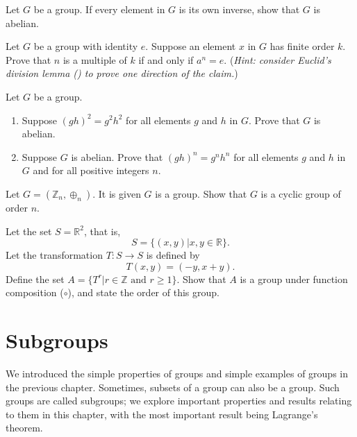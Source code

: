 \begin{problem}
    Let $G$ be a group. If every element in $G$ is its own inverse, show that $G$ is abelian.
\end{problem}

\begin{problem}\label{problem-element-to-power-of-multiple-of-order-is-identity}
    Let $G$ be a group with identity $e$. Suppose an element $x$ in $G$ has finite order $k$. Prove that $n$ is a multiple of $k$ if and only if $a^n = e$.\newline
    (\textit{Hint: consider Euclid's division lemma () to prove one direction of the claim.})
\end{problem}

\begin{problem}
    Let $G$ be a group.
    \begin{enumerate}[label=(\alph*)]
        \item Suppose $(gh)^2 = g^2h^2$ for all elements $g$ and $h$ in $G$. Prove that $G$ is abelian.
        \item Suppose $G$ is abelian. Prove that $(gh)^n = g^nh^n$ for all elements $g$ and $h$ in $G$ and for all positive integers $n$.
    \end{enumerate}
\end{problem}

\begin{problem}
    Let $G = (\mathbb{Z}_n, \oplus_n)$. It is given $G$ is a group. Show that $G$ is a cyclic group of order $n$.
\end{problem}

\newpage

\begin{problem}
    Let the set $S = \mathbb{R}^2$, that is,
    \[
        S = \{(x, y) \vert x, y \in \mathbb{R}\}.
    \]
    Let the transformation $T: S \to S$ is defined by
    \[
        T(x, y) = (-y, x+y).
    \]
    Define the set $A = \{T^r \vert r \in \mathbb{Z} \text{ and } r \geq 1\}$. Show that $A$ is a group under function composition ($\circ$), and state the order of this group.
\end{problem}

\chapter{Subgroups}
We introduced the simple properties of groups and simple examples of groups in the previous chapter. Sometimes, subsets of a group can also be a group. Such groups are called subgroups; we explore important properties and results relating to them in this chapter, with the most important result being Lagrange's theorem.


